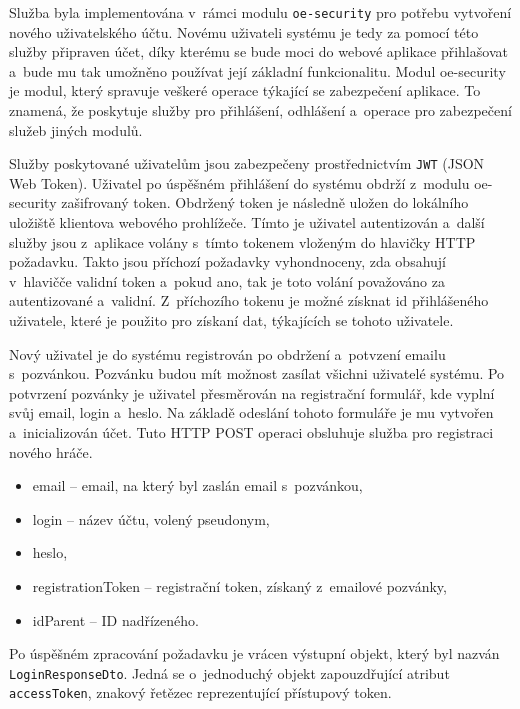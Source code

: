 \documentclass[twoside, 12pt]{article}
\begin{document}
{\clearpage


Služba byla implementována v~rámci modulu \texttt{oe-security} pro potřebu vytvoření nového uživatelského účtu.
Novému uživateli systému je tedy za pomocí této služby připraven účet,
díky kterému se bude moci do webové aplikace přihlašovat a~bude mu tak umožněno používat její základní funkcionalitu.
Modul oe-security je modul, který spravuje veškeré operace týkající se zabezpečení aplikace.
To znamená, že poskytuje služby pro přihlášení, odhlášení a~operace pro zabezpečení služeb jiných modulů.

Služby poskytované uživatelům jsou zabezpečeny prostřednictvím \texttt{JWT} (JSON Web Token).
Uživatel po úspěšném přihlášení do systému obdrží z~modulu oe-security zašifrovaný token.
Obdržený token je následně uložen do lokálního uložiště klientova webového prohlížeče.
Tímto je uživatel autentizován a~další služby jsou z~aplikace volány s~tímto tokenem vloženým do hlavičky HTTP požadavku.
Takto jsou příchozí požadavky vyhondnoceny, zda obsahují v~hlavičče validní token a~pokud ano,
tak je toto volání považováno za autentizované a~validní.
Z~příchozího tokenu je možné získnat id přihlášeného uživatele,
které je použito pro získaní dat, týkajících se tohoto uživatele.

Nový uživatel je do systému registrován po obdržení a~potvzení emailu s~pozvánkou.
Pozvánku budou mít možnost zasílat všichni uživatelé systému.
Po potvrzení pozvánky je uživatel přesměrován na registrační
formulář, kde vyplní svůj email, login a~heslo.
Na základě odeslání tohoto formuláře je mu vytvořen a~inicializován účet.
Tuto HTTP POST operaci obsluhuje služba pro registraci nového hráče.

\vspace{10}

\begin{itemize}
\item email -- email, na který byl zaslán email s~pozvánkou,
\item login -- název účtu, volený pseudonym,
\item heslo,
\item registrationToken -- registrační token, získaný z~emailové pozvánky,
\item idParent -- ID nadřízeného.
\end{itemize}

Po úspěšném zpracování požadavku je vrácen výstupní objekt,
který byl nazván \texttt{LoginResponseDto}.
Jedná se o~jednoduchý objekt zapouzdřující atribut \texttt{accessToken}, znakový řetězec reprezentující přístupový token.

}
\end{document}
